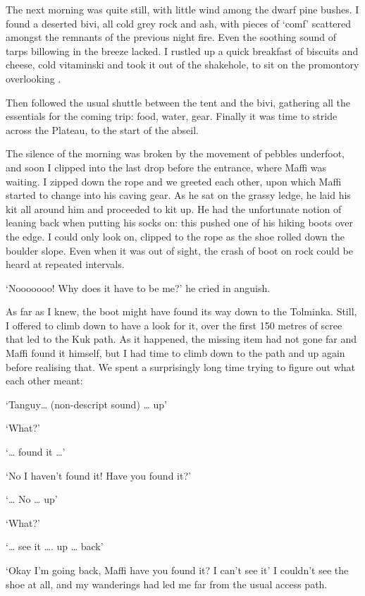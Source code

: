The next morning was quite still, with little wind among the dwarf pine bushes. I found a deserted bivi, all cold grey rock and ash, with pieces of ‘comf’ scattered amongst the remnants of the previous night fire. Even the soothing sound of tarps billowing in the breeze lacked. I rustled up a quick breakfast of biscuits and cheese, cold vitaminski and took it out of the shakehole, to sit on the promontory overlooking . 

Then followed the usual shuttle between the tent and the bivi, gathering all the essentials for the coming trip: food, water, gear. Finally it was time to stride across the Plateau, to the start of the abseil. 

The silence of the morning was broken by the movement of pebbles underfoot, and soon I clipped into the last drop before the entrance, where Maffi was waiting. I zipped down the rope and we greeted each other, upon which Maffi started to change into his caving gear. As he sat on the grassy ledge, he laid his kit all around him and proceeded to kit up. He had the unfortunate notion of leaning back when putting his socks on: this pushed one of his hiking boots over the edge. I could only look on, clipped to the rope as the shoe rolled down the boulder slope. Even when it was out of sight, the crash of boot on rock could be heard at repeated intervals. 

‘Nooooooo! Why does it have to be me?’ he cried in anguish. 

As far as I knew, the boot might have found its way down to the Tolminka. Still, I offered to climb down to have a look for it, over the first 150 metres of scree that led to the Kuk path. As it happened, the missing item had not gone far and Maffi found it himself, but I had time to climb down to the path and up again before realising that. We spent a surprisingly long time trying to figure out what each other meant: 

‘Tanguy… (non-descript sound) …  up’ 

‘What?’ 

‘… found it …’ 

‘No I haven’t found it! Have you found it?’ 

 ‘… No … up’  
 
‘What?’ 

‘… see it …. up … back’ 

‘Okay I’m going back, Maffi have you found it? I can’t see it’  I couldn’t see the shoe at all, and my wanderings had led me far from the usual access path.

